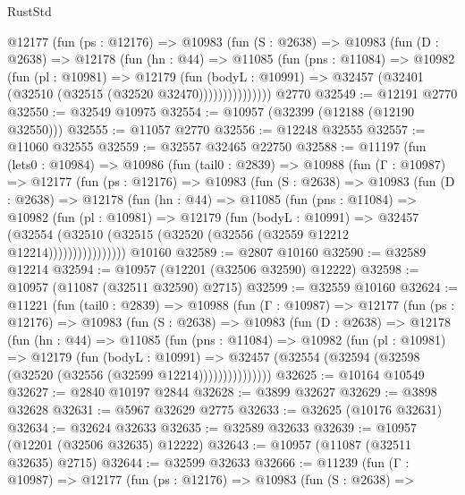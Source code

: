 \begin{lexlean}{RustStd}
\begin{coremodule}
          @12177
            (fun (ps : @12176) =>
            @10983
              (fun (S : @2638) =>
              @10983
                (fun (D : @2638) =>
                @12178
                  (fun (hn : @44) =>
                  @11085
                    (fun (pns : @11084) =>
                    @10982
                      (fun (pl : @10981) =>
                      @12179
                        (fun (bodyL : @10991) =>
                        @32457 (@32401 (@32510 (@32515 (@32520 @32470)))))))))))))))
    @2770
@32549 := @12191 @2770
@32550 := @32549 @10975
@32554 := @10957 (@32399 (@12188 (@12190 @32550)))
@32555 := @11057 @2770
@32556 := @12248 @32555
@32557 := @11060 @32555
@32559 := @32557 @32465 @22750
@32588 := @11197
    (fun (lets0 : @10984) =>
    @10986
      (fun (tail0 : @2839) =>
      @10988
        (fun (Γ : @10987) =>
        @12177
          (fun (ps : @12176) =>
          @10983
            (fun (S : @2638) =>
            @10983
              (fun (D : @2638) =>
              @12178
                (fun (hn : @44) =>
                @11085
                  (fun (pns : @11084) =>
                  @10982
                    (fun (pl : @10981) =>
                    @12179
                      (fun (bodyL : @10991) =>
                      @32457
                        (@32554
                          (@32510 (@32515 (@32520 (@32556 (@32559 @12212 @12214))))))))))))))))
    @10160
@32589 := @2807 @10160
@32590 := @32589 @12214
@32594 := @10957 (@12201 (@32506 @32590) @12222)
@32598 := @10957 (@11087 (@32511 @32590) @2715)
@32599 := @32559 @10160
@32624 := @11221
    (fun (tail0 : @2839) =>
    @10988
      (fun (Γ : @10987) =>
      @12177
        (fun (ps : @12176) =>
        @10983
          (fun (S : @2638) =>
          @10983
            (fun (D : @2638) =>
            @12178
              (fun (hn : @44) =>
              @11085
                (fun (pns : @11084) =>
                @10982
                  (fun (pl : @10981) =>
                  @12179
                    (fun (bodyL : @10991) =>
                    @32457 (@32554 (@32594 (@32598 (@32520 (@32556 (@32599 @12214)))))))))))))))
@32625 := @10164 @10549
@32627 := @2840 @10197 @2844
@32628 := @3899 @32627
@32629 := @3898 @32628
@32631 := @5967 @32629 @2775
@32633 := @32625 (@10176 @32631)
@32634 := @32624 @32633
@32635 := @32589 @32633
@32639 := @10957 (@12201 (@32506 @32635) @12222)
@32643 := @10957 (@11087 (@32511 @32635) @2715)
@32644 := @32599 @32633
@32666 := @11239
    (fun (Γ : @10987) =>
    @12177
      (fun (ps : @12176) =>
      @10983
        (fun (S : @2638) =>

\end{coremodule}
\end{lexlean}
